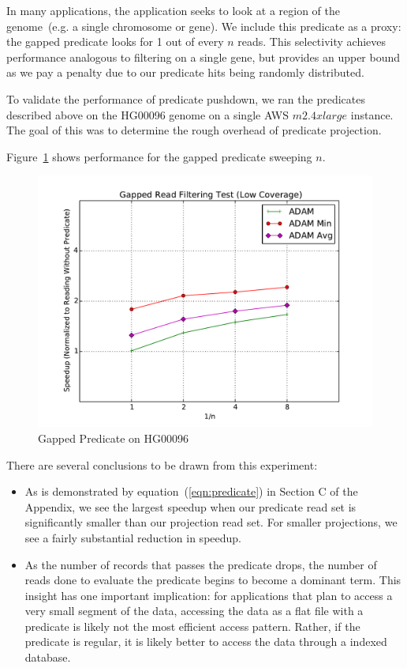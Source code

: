 \documentclass[10pt,twocolumn]{article}
\theoremstyle{plain}
\begin{document}
In many applications, the application seeks to look at a region of the genome~(e.g. a single chromosome or gene). We include this
predicate as a proxy: the gapped predicate looks for 1 out of every $n$ reads. This selectivity achieves performance analogous to filtering
on a single gene, but provides an upper bound as we pay a penalty due to our predicate hits being randomly distributed.

To validate the performance of predicate pushdown, we ran the predicates described above on the HG00096 genome on a
single AWS $m2.4xlarge$ instance. The goal of this was to determine the rough overhead of predicate projection.

Figure~\ref{fig:gapped-filter} shows performance for the gapped predicate sweeping $n$.

\begin{figure}[h]
\begin{center}
\includegraphics[width=\linewidth]{microbenchmarks/gapped_predicate_low_coverage.pdf}
\end{center}
\caption{Gapped Predicate on HG00096}
\label{fig:gapped-filter}
\end{figure}

There are several conclusions to be drawn from this experiment:

\begin{itemize}
\item As is demonstrated by equation~(\ref{eqn:predicate}) in Section C of the Appendix, we see the largest speedup when our predicate read set is significantly
smaller than our projection read set. For smaller projections, we see a fairly substantial reduction in speedup.
\item As the number of records that passes the predicate drops, the number of reads done to evaluate the predicate begins to become
a dominant term. This insight has one important implication: for applications that plan to access a very small segment of the data, accessing the
data as a flat file with a predicate is likely not the most efficient access pattern. Rather, if the predicate is regular, it is likely better to access
the data through a indexed database.
\end{itemize}
\end{document}
